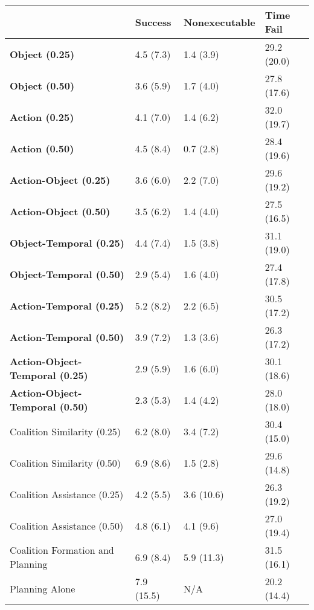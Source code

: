 \begin{tabular}{llll}
\hline
                                        & Success    & Nonexecutable   & Time Fail   \\
\hline
 \textbf{Object (0.25)}                 & 4.5 (7.3)  & 1.4 (3.9)       & 29.2 (20.0) \\
 \textbf{Object (0.50)}                 & 3.6 (5.9)  & 1.7 (4.0)       & 27.8 (17.6) \\
 \textbf{Action (0.25)}                 & 4.1 (7.0)  & 1.4 (6.2)       & 32.0 (19.7) \\
 \textbf{Action (0.50)}                 & 4.5 (8.4)  & 0.7 (2.8)       & 28.4 (19.6) \\
 \textbf{Action-Object (0.25)}          & 3.6 (6.0)  & 2.2 (7.0)       & 29.6 (19.2) \\
 \textbf{Action-Object (0.50)}          & 3.5 (6.2)  & 1.4 (4.0)       & 27.5 (16.5) \\
 \textbf{Object-Temporal (0.25)}        & 4.4 (7.4)  & 1.5 (3.8)       & 31.1 (19.0) \\
 \textbf{Object-Temporal (0.50)}        & 2.9 (5.4)  & 1.6 (4.0)       & 27.4 (17.8) \\
 \textbf{Action-Temporal (0.25)}        & 5.2 (8.2)  & 2.2 (6.5)       & 30.5 (17.2) \\
 \textbf{Action-Temporal (0.50)}        & 3.9 (7.2)  & 1.3 (3.6)       & 26.3 (17.2) \\
 \textbf{Action-Object-Temporal (0.25)} & 2.9 (5.9)  & 1.6 (6.0)       & 30.1 (18.6) \\
 \textbf{Action-Object-Temporal (0.50)} & 2.3 (5.3)  & 1.4 (4.2)       & 28.0 (18.0) \\
 Coalition Similarity (0.25)            & 6.2 (8.0)  & 3.4 (7.2)       & 30.4 (15.0) \\
 Coalition Similarity (0.50)            & 6.9 (8.6)  & 1.5 (2.8)       & 29.6 (14.8) \\
 Coalition Assistance (0.25)            & 4.2 (5.5)  & 3.6 (10.6)      & 26.3 (19.2) \\
 Coalition Assistance (0.50)            & 4.8 (6.1)  & 4.1 (9.6)       & 27.0 (19.4) \\
 Coalition Formation and Planning       & 6.9 (8.4)  & 5.9 (11.3)      & 31.5 (16.1) \\
 Planning Alone                         & 7.9 (15.5) & N/A             & 20.2 (14.4) \\
\hline
\end{tabular}